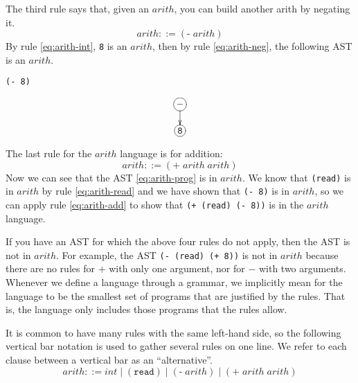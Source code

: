 \documentclass[12pt]{book}
\newcommand{\itm}[1]{\ensuremath{\mathit{#1}}}
\newcommand{\Int}{\itm{int}}
\newcommand{\key}[1]{\texttt{#1}}
\begin{document}
The third rule says that, given an $\itm{arith}$, you can build
another arith by negating it.
\begin{equation}
  \itm{arith} ::= (\key{-} \; \itm{arith})  \label{eq:arith-neg}
\end{equation}
By rule \eqref{eq:arith-int}, \texttt{8} is an $\itm{arith}$, then by
rule \eqref{eq:arith-neg}, the following AST is an $\itm{arith}$.
\begin{center}
\begin{minipage}{0.25\textwidth}
\begin{lstlisting}
(- 8)
\end{lstlisting}
\end{minipage}
\begin{minipage}{0.25\textwidth}
\begin{equation}
\xymatrix@=15pt{
 *+[Fo]{-} \ar[d] \\
 *+[Fo]{\tt 8} 
}
\label{eq:arith-neg8}
\end{equation}
\end{minipage}
\end{center}

The last rule for the $\itm{arith}$ language is for addition:
\begin{equation}
  \itm{arith} ::= (\key{+} \; \itm{arith} \; \itm{arith}) \label{eq:arith-add}
\end{equation}
Now we can see that the AST \eqref{eq:arith-prog} is in $\itm{arith}$.
We know that \lstinline{(read)} is in $\itm{arith}$ by rule
\eqref{eq:arith-read} and we have shown that \texttt{(- 8)} is in
$\itm{arith}$, so we can apply rule \eqref{eq:arith-add} to show that
\texttt{(+ (read) (- 8))} is in the $\itm{arith}$ language.

If you have an AST for which the above four rules do not apply, then
the AST is not in $\itm{arith}$. For example, the AST \texttt{(- (read)
  (+ 8))} is not in $\itm{arith}$ because there are no rules for $+$
with only one argument, nor for $-$ with two arguments.  Whenever we
define a language through a grammar, we implicitly mean for the
language to be the smallest set of programs that are justified by the
rules. That is, the language only includes those programs that the
rules allow.

It is common to have many rules with the same left-hand side, so the
following vertical bar notation is used to gather several rules on one
line.  We refer to each clause between a vertical bar as an
``alternative''.
\[
\itm{arith} ::= \Int \mid (\key{read}) \mid (\key{-} \; \itm{arith}) \mid
   (\key{+} \; \itm{arith} \; \itm{arith}) 
\]
\end{document}
